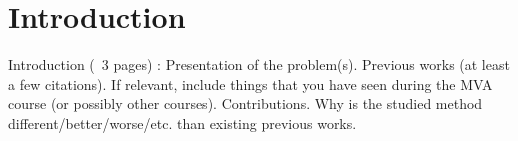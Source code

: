 \section{Introduction}

Introduction (~3 pages) : 
Presentation of the problem(s). 
Previous works (at least a few citations). If relevant, include things that you have seen during the MVA course (or possibly other courses). 
Contributions. Why is the studied method different/better/worse/etc. than existing previous works. 
